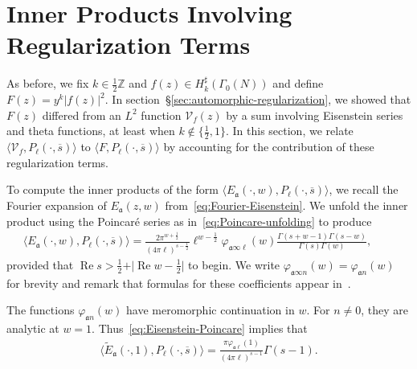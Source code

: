 \documentclass[11pt,reqno]{amsart}
\theoremstyle{plain}
\theoremstyle{definition}
\numberwithin{equation}{section}
\renewcommand{\Re}{\operatorname{Re}}
\begin{document}
\section{Inner Products Involving Regularization Terms} \label{sec:regularization-inner-products}

As before, we fix $k \in \frac{1}{2} \mathbb{Z}$ and $f(z) \in H_k^\sharp(\Gamma_0(N))$ and define $F(z) = y^k \vert f(z) \vert^2$. In section~\S{\ref{sec:automorphic-regularization}}, we showed that $F(z)$ differed from an $L^2$ function $\mathcal{V}_f(z)$ by a sum involving Eisenstein series and theta functions, at least when $k \notin \{\frac{1}{2}, 1\}$. In this section, we relate $\langle \mathcal{V}_f, P_\ell(\cdot,\overline{s}) \rangle$ to $\langle F, P_\ell(\cdot,\overline{s}) \rangle$ by accounting for the contribution of these regularization terms.

To compute the inner products of the form $\langle E_\mathfrak{a}(\cdot, w), P_\ell(\cdot, \overline{s}) \rangle$, we recall the Fourier expansion of $E_\mathfrak{a}(z,w)$ from~\eqref{eq:Fourier-Eisenstein}. We unfold the inner product using the Poincar\'e series as in~\eqref{eq:Poincare-unfolding} to produce
\begin{align} \label{eq:Eisenstein-Poincare}
	\langle E_\mathfrak{a}(\cdot, w), P_\ell(\cdot, \overline{s}) \rangle 
		=\frac{2\pi^{w+\frac{1}{2}}}{(4\pi \ell)^{s-\frac{1}{2}}} \ell^{w-\frac{1}{2}} 
			\varphi_{\mathfrak{a} \infty \ell}(w) \frac{\Gamma(s+w-1)\Gamma(s-w)}{\Gamma(s)\Gamma(w)},
	\qquad
\end{align}
provided that $\Re s >  \frac{1}{2} + \vert \Re w - \frac{1}{2} \vert$ to begin. We write $\varphi_{\mathfrak{a} \infty n}(w) = \varphi_{\mathfrak{a} n}(w)$ for brevity and remark that formulas for these coefficients appear in~\cite{DeshouillersIwaniec82}.

The functions $\varphi_{\mathfrak{a} n}(w)$ have meromorphic continuation in $w$. For $n \neq 0$, they are analytic at $w=1$. Thus~\eqref{eq:Eisenstein-Poincare} implies that
\begin{align}
	\langle \widetilde{E}_\mathfrak{a}(\cdot, 1), P_\ell(\cdot, \overline{s}) \rangle 
		=\frac{\pi \varphi_{\mathfrak{a} \ell}(1)}{(4\pi \ell)^{s-1}}
			 \Gamma(s-1).
\end{align}
\end{document}

